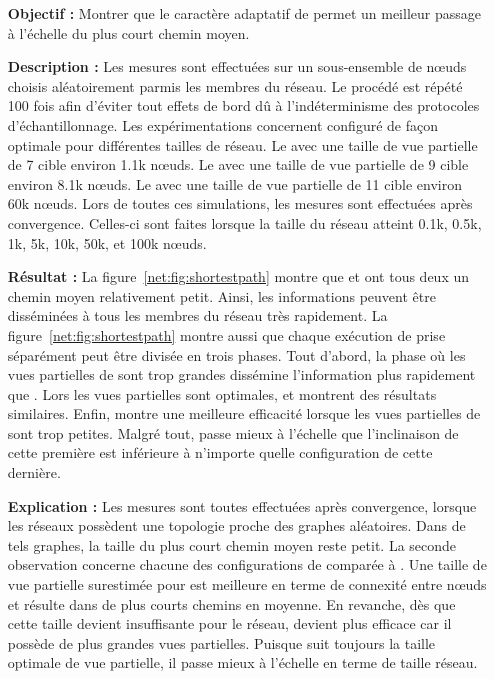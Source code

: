 \begin{itemize}
\item [\textbf{Objectif :}] Montrer que le caractère adaptatif de \SPRAY permet
  un meilleur passage à l'échelle du plus court chemin moyen.
\item [\textbf{Description :}] Les mesures sont effectuées sur un sous-ensemble
  de nœuds choisis aléatoirement parmis les membres du réseau. Le procédé est
  répété 100 fois afin d'éviter tout effets de bord dû à l'indéterminisme des
  protocoles d'échantillonnage. Les expérimentations concernent \CYCLON
  configuré de façon optimale pour différentes tailles de réseau. Le \CYCLON
  avec une taille de vue partielle de 7 cible environ 1.1k nœuds. Le \CYCLON
  avec une taille de vue partielle de 9 cible environ 8.1k nœuds. Le \CYCLON
  avec une taille de vue partielle de 11 cible environ 60k nœuds. Lors de toutes
  ces simulations, les mesures sont effectuées après convergence. Celles-ci sont
  faites lorsque la taille du réseau atteint 0.1k, 0.5k, 1k, 5k, 10k, 50k, et
  100k nœuds.
\item [\textbf{Résultat :}] La figure~\ref{net:fig:shortestpath} montre que
  \CYCLON et \SPRAY ont tous deux un chemin moyen relativement petit. Ainsi, les
  informations peuvent être disséminées à tous les membres du réseau très
  rapidement. La figure~\ref{net:fig:shortestpath} montre aussi que chaque
  exécution de \CYCLON prise séparément peut être divisée en trois phases.  Tout
  d'abord, la phase où les vues partielles de \CYCLON sont trop grandes
  dissémine l'information plus rapidement que \SPRAY. Lors les vues partielles
  sont optimales, \CYCLON et \SPRAY montrent des résultats similaires. Enfin,
  \SPRAY montre une meilleure efficacité lorsque les vues partielles de \CYCLON
  sont trop petites. Malgré tout, \SPRAY passe mieux à l'échelle que \CYCLON
  l'inclinaison de cette première est inférieure à n'importe quelle
  configuration de cette dernière.
\item [\textbf{Explication :}] Les mesures sont toutes effectuées après
  convergence, lorsque les réseaux possèdent une topologie proche des graphes
  aléatoires.  Dans de tels graphes, la taille du plus court chemin moyen reste
  petit.  La seconde observation concerne chacune des configurations de \CYCLON
  comparée à \SPRAY. Une taille de vue partielle surestimée pour \CYCLON est
  meilleure en terme de connexité entre nœuds et résulte dans de plus courts
  chemins en moyenne. En revanche, dès que cette taille devient insuffisante
  pour le réseau, \SPRAY devient plus efficace car il possède de plus grandes
  vues partielles. Puisque \SPRAY suit toujours la taille optimale de vue
  partielle, il passe mieux à l'échelle en terme de taille réseau.
\end{itemize}

